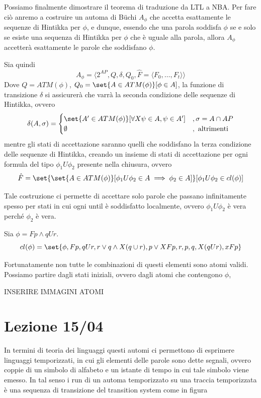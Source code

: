 Possiamo finalmente dimostrare il teorema di traduzione da LTL a NBA\@.
Per fare ciò anremo a costruire un automa di Büchi \(A_\phi\) che accetta esattamente le sequenze di Hintikka per \(\phi\), e dunque, essendo che una parola soddisfa \(\phi\) se e solo se esiste una sequenza di Hintikka per \(\phi\) che è uguale alla parola, allora \(A_\phi\) accetterà esattamente le parole che soddisfano \(\phi\).

Sia quindi \[A_\phi = \langle 2^{AP}, Q, \delta, Q_0, \hat{F} = \langle F_0, \ldots, F_t\rangle\rangle\]
Dove \(Q = ATM(\phi)\), \(Q_0 = \set{A \in ATM(\phi) }[\phi \in A]\), la funzione di transizione \(\delta\) si assicurerà che varrà la seconda condizione delle sequenze di Hintikka, ovvero
\[\delta(A,\sigma)=\begin{cases}
    \set{A'\in ATM(\phi)}[\forall X\psi \in A, \psi \in A'] & , \sigma = A \cap AP \\
    \emptyset                                               & , \text{ altrimenti}
  \end{cases}\]
mentre gli stati di accettazione saranno quelli che soddisfano la terza condizione delle sequenze di Hintikka, creando un insieme di stati di accettazione per ogni formula del tipo \(\phi_1 U \phi_2\) presente nella chiusura, ovvero
\[\hat{F} = \set{\set{A\in ATM(\phi)}[\phi_1 U \phi_2 \in A \implies \phi_2\in A]}[\phi_1 U \phi_2 \in cl(\phi)]\]

Tale costruzione ci permette di accettare solo parole che passano infinitamente spesso per stati in cui ogni until è soddisfatto localmente, ovvero \(\phi_1 U \phi_2\) è vera perché \(\phi_2\) è vera.


\begin{example}{}
  Sia \(\phi= F p \land q U r\).
  \[cl(\phi) = \set{\phi, Fp,qUr, r\lor q \land X(q\cup r),p\lor XFp, r,p,q,X(qUr),xFp}\]

  Fortunatamente non tutte le combinazioni di questi elementi sono atomi validi.
  Possiamo partire dagli stati iniziali, ovvero dagli atomi che contengono \(\phi\),

  INSERIRE IMMAGINI ATOMI
\end{example}

\chapter{Lezione 15/04}

In termini di teoria dei linguaggi questi automi ci permettono di esprimere linguaggi temporizzati, in cui gli elementi delle parole sono dette segnali, ovvero coppie di un simbolo di alfabeto e un istante di tempo in cui tale simbolo viene emesso. In tal senso i run di un automa temporizzato su una traccia temporizzata è una sequenza di transizione del transition system come in figura

